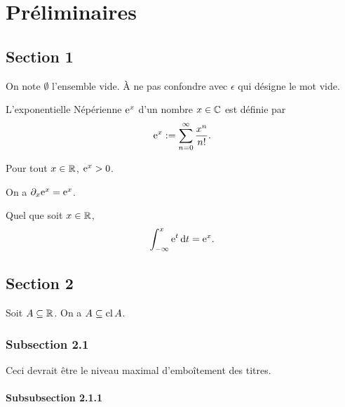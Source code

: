 \chapter{Préliminaires}
\label{ch:prelim}


\section{Section 1}

On note $\emptyset$ l'ensemble vide.  À ne pas confondre avec
$\epsilon$ qui désigne le mot vide.

\begin{definition}
  \label{def:expo}
  L'exponentielle Népérienne $\e^x$ d'un nombre $x \in \IC$ est
  définie par
  \begin{equation}
    \label{eq:exp}
    \e^x := \sum_{n=0}^\infty \frac{x^n}{n!}.
  \end{equation}
\end{definition}

\begin{proposition}
  \label{pos-expo}
  Pour tout $x \in \IR$, $\e^x > 0$.
\end{proposition}

\begin{proposition}
  On a $\partial_x \e^x = \e^x$.
\end{proposition}

\begin{corollary}
  Quel que soit $x \in \IR$,
  \begin{equation*}
    \int_{-\infty}^x \e^t \intd t = \e^x.
  \end{equation*}
\end{corollary}


\section{Section 2}

\begin{lemma}
  \label{closure}
  Soit $A \subseteq \IR$.  On a $A \subseteq \cl A$.
\end{lemma}

\subsection{Subsection 2.1}

Ceci devrait être le niveau maximal d'emboîtement des titres.

\subsubsection{Subsubsection 2.1.1}

